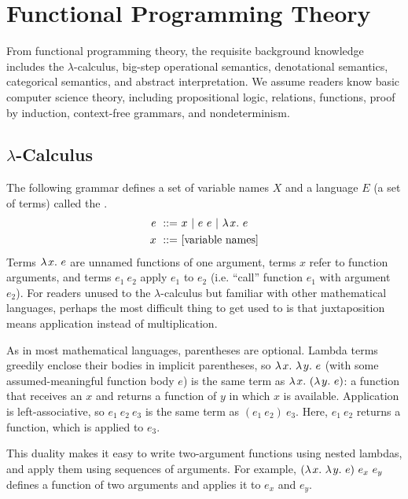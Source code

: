 \section{Functional Programming Theory}

From functional programming theory, the requisite background knowledge includes the $\lambda$-calculus, big-step operational semantics, denotational semantics, categorical semantics, and abstract interpretation.
We assume readers know basic computer science theory, including propositional logic, relations, functions, proof by induction, context-free grammars, and nondeterminism.

\subsection{$\lambda$-Calculus}

The following grammar defines a set of variable names $X$ and a language $E$ (a set of terms) called the .
\begin{equation}
\begin{aligned}
	e\ ::=&\ x\ |\ e~e\ |\ \lambda\mspace{2mu}{x}\ldotp\, e \\
	x\ ::=&\ \text{[variable names]}
\end{aligned}
\end{equation}
Terms $\lambda\mspace{2mu}{x}\ldotp\, e$ are unnamed functions of one argument, terms $x$ refer to function arguments, and terms $e_1~e_2$ apply $e_1$ to $e_2$ (i.e. ``call'' function $e_1$ with argument $e_2$).
For readers unused to the $\lambda$-calculus but familiar with other mathematical languages, perhaps the most difficult thing to get used to is that juxtaposition means application instead of multiplication.

As in most mathematical languages, parentheses are optional.
Lambda terms greedily enclose their bodies in implicit parentheses, so $\lambda\mspace{2mu}{x}\ldotp\,\lambda\mspace{2mu}{y}\ldotp\, e$ (with some assumed-meaningful function body $e$) is the same term as $\lambda\mspace{2mu}{x}\ldotp\,(\lambda\mspace{2mu}{y}\ldotp\, e)$: a function that receives an $x$ and returns a function of $y$ in which $x$ is available.
Application is left-associative, so $e_1~e_2~e_3$ is the same term as $(e_1~e_2)~e_3$.
Here, $e_1~e_2$ returns a function, which is applied to $e_3$.

This duality makes it easy to write two-argument functions using nested lambdas, and apply them using sequences of arguments.
For example, $(\lambda\mspace{2mu}{x}\ldotp\, \lambda\mspace{2mu}{y}\ldotp\, e)~e_x~e_y$ defines a function of two arguments and applies it to $e_x$ and $e_y$.

